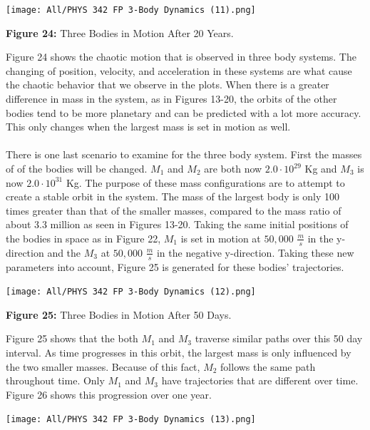 \documentclass[]{article}
\begin{document}
\begin{multicols}{2}
\begin{center}
\texttt{[image: All/PHYS 342 FP 3-Body Dynamics (11).png]}
\caption{\small{\textbf{Figure 24:}} \tiny{Three Bodies in Motion After 20 Years.}}
\end{center}
Figure 24 shows the chaotic motion that is observed in three body systems. The changing of position, velocity, and acceleration in these systems are what cause the chaotic behavior that we observe in the plots. When there is a greater difference in mass in the system, as in Figures 13-20, the orbits of the other bodies tend to be more planetary and can be predicted with a lot more accuracy. This only changes when the largest mass is set in motion as well. 
\par
\paragraph{}
\setlength{\parskip}{1em}
There is one last scenario to examine for the three body system. First the masses of of the bodies will be changed. $M_1$ and $M_2$ are both now $2.0\cdot10^{29}$ Kg and $M_3$ is now $2.0\cdot10^{31}$ Kg. The purpose of these mass configurations are to attempt to create a stable orbit in the system. The mass of the largest body is only 100 times greater than that of the smaller masses, compared to the mass ratio of about 3.3 million as seen in Figures 13-20. Taking the same initial positions of the bodies in space as in Figure 22, $M_1$ is set in motion at $50,000$ $\frac{m}{s}$ in the y-direction and the $M_3$ at $50,000$ $\frac{m}{s}$ in the negative y-direction. Taking these new parameters into account, Figure 25 is generated for these bodies' trajectories.
\begin{center}
\texttt{[image: All/PHYS 342 FP 3-Body Dynamics (12).png]}
\caption{\small{\textbf{Figure 25:}} \tiny{Three Bodies in Motion After 50 Days.}}
\end{center}
Figure 25 shows that the both $M_1$ and $M_3$ traverse similar paths over this 50 day interval. As time progresses in this orbit, the largest mass is only influenced by the two smaller masses. Because of this fact, $M_2$ follows the same path throughout time. Only $M_1$ and $M_3$ have trajectories that are different over time. Figure 26 shows this progression over one year.
\begin{center}
\texttt{[image: All/PHYS 342 FP 3-Body Dynamics (13).png]}

\end{center}
\end{multicols}
\end{document}
